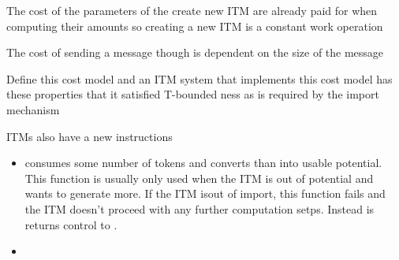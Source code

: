 The cost of the parameters of the create new ITM are already paid for when computing their amounts so creating a new ITM is a constant work operation

The cost of sending a message though is dependent on the size of the message

Define this cost model and an ITM system that implements this cost model has these properties that it satisfied T-bounded ness as is required by the import mechanism



ITMs also have a new instructions
\begin{itemize}
	\item {} consumes some number of tokens and converts than into usable potential. This function is usually only used when the ITM is out of potential and wants to generate more. If the ITM isout of import, this function fails and the ITM doesn't proceed with any further computation setps. Instead is returns control to .
	\item 
\end{itemize}

